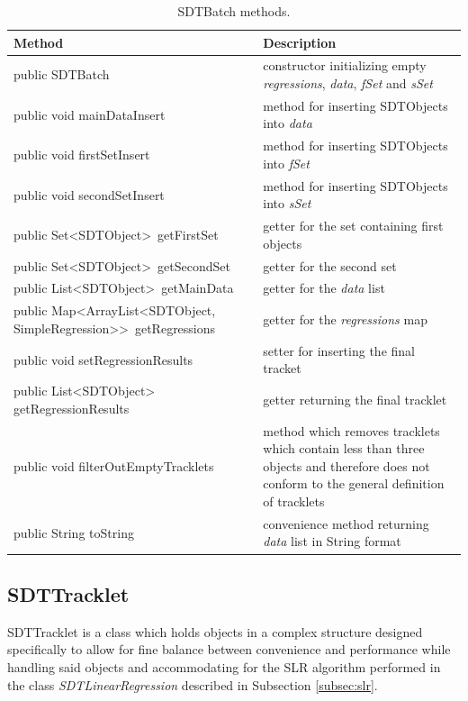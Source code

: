 \begin{table}[H]
\centering
\setlength{\extrarowheight}{2pt}
\begin{tabularx}{\textwidth}{|X|X|}
\hline
\textbf{Method} & \textbf{Description} \\ \hline
public \mbox{SDTBatch} & constructor initializing empty \emph{regressions}, \emph{data}, \emph{fSet} and \emph{sSet} \\ \hline
public void \mbox{mainDataInsert} & method for inserting \mbox{SDTObjects} into \emph{data} \\ \hline
public void \mbox{firstSetInsert} & method for inserting \mbox{SDTObjects} into \emph{fSet} \\ \hline
public void \mbox{secondSetInsert} & method for inserting \mbox{SDTObjects} into \emph{sSet} \\ \hline
public \mbox{Set<SDTObject> getFirstSet} & getter for the set containing first objects \\ \hline
public \mbox{Set<SDTObject> getSecondSet} & getter for the second set \\ \hline
public \mbox{List<SDTObject> getMainData} & getter for the \emph{data} list \\ \hline
public \mbox{Map<ArrayList<SDTObject,} \mbox{SimpleRegression>{}>{} getRegressions} & getter for the \emph{regressions} map \\ \hline
public void \mbox{setRegressionResults} & setter for inserting the final tracket \\ \hline
public \mbox{List<SDTObject>} \mbox{getRegressionResults} & getter returning the final tracklet \\ \hline
public void \mbox{filterOutEmptyTracklets} & method which removes tracklets which contain less than three objects and therefore does not conform to the general definition of tracklets \\ \hline
public String \mbox{toString} & convenience method returning \emph{data} list in String format \\ \hline
\end{tabularx}
\caption{SDTBatch methods.}
\label{tab:class_methods_B}
\end{table}

\newpage

\subsection{SDTTracklet}\label{subsec:tracklet}

	SDTTracklet is a class which holds objects in a complex structure designed specifically to allow for fine balance between convenience and performance while handling said objects and accommodating for the SLR algorithm performed in the class \emph{SDTLinearRegression} described in Subsection \ref{subsec:slr}.
	
